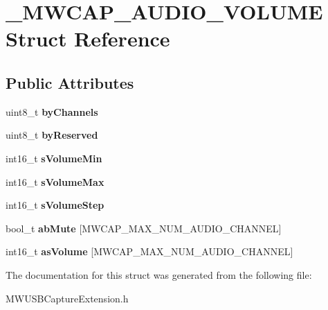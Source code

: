 \hypertarget{struct__MWCAP__AUDIO__VOLUME}{\section{\-\_\-\-M\-W\-C\-A\-P\-\_\-\-A\-U\-D\-I\-O\-\_\-\-V\-O\-L\-U\-M\-E Struct Reference}
\label{struct__MWCAP__AUDIO__VOLUME}
}
\subsection*{Public Attributes}
\begin{DoxyCompactItemize}
\item 
\hypertarget{struct__MWCAP__AUDIO__VOLUME_a79cacdba863d57ae42fa40f0dccd92c0}{uint8\-\_\-t {\bfseries by\-Channels}}\label{struct__MWCAP__AUDIO__VOLUME_a79cacdba863d57ae42fa40f0dccd92c0}

\item 
\hypertarget{struct__MWCAP__AUDIO__VOLUME_a0ebf174c712040c84ac34cc874995784}{uint8\-\_\-t {\bfseries by\-Reserved}}\label{struct__MWCAP__AUDIO__VOLUME_a0ebf174c712040c84ac34cc874995784}

\item 
\hypertarget{struct__MWCAP__AUDIO__VOLUME_a1471c5f9d344ffcbb7980cb4a1493cd4}{int16\-\_\-t {\bfseries s\-Volume\-Min}}\label{struct__MWCAP__AUDIO__VOLUME_a1471c5f9d344ffcbb7980cb4a1493cd4}

\item 
\hypertarget{struct__MWCAP__AUDIO__VOLUME_ab17fd12349d7bf6886bf74f02471d265}{int16\-\_\-t {\bfseries s\-Volume\-Max}}\label{struct__MWCAP__AUDIO__VOLUME_ab17fd12349d7bf6886bf74f02471d265}

\item 
\hypertarget{struct__MWCAP__AUDIO__VOLUME_a61e36488a23ba067329cc83cac6f8ced}{int16\-\_\-t {\bfseries s\-Volume\-Step}}\label{struct__MWCAP__AUDIO__VOLUME_a61e36488a23ba067329cc83cac6f8ced}

\item 
\hypertarget{struct__MWCAP__AUDIO__VOLUME_a7abc93898d756f31359bf9907150d4a7}{bool\-\_\-t {\bfseries ab\-Mute} \mbox{[}M\-W\-C\-A\-P\-\_\-\-M\-A\-X\-\_\-\-N\-U\-M\-\_\-\-A\-U\-D\-I\-O\-\_\-\-C\-H\-A\-N\-N\-E\-L\mbox{]}}\label{struct__MWCAP__AUDIO__VOLUME_a7abc93898d756f31359bf9907150d4a7}

\item 
\hypertarget{struct__MWCAP__AUDIO__VOLUME_a97d7f0d83086475dc72f55986a4800b8}{int16\-\_\-t {\bfseries as\-Volume} \mbox{[}M\-W\-C\-A\-P\-\_\-\-M\-A\-X\-\_\-\-N\-U\-M\-\_\-\-A\-U\-D\-I\-O\-\_\-\-C\-H\-A\-N\-N\-E\-L\mbox{]}}\label{struct__MWCAP__AUDIO__VOLUME_a97d7f0d83086475dc72f55986a4800b8}

\end{DoxyCompactItemize}


The documentation for this struct was generated from the following file\-:\begin{DoxyCompactItemize}
\item 
M\-W\-U\-S\-B\-Capture\-Extension.\-h\end{DoxyCompactItemize}
